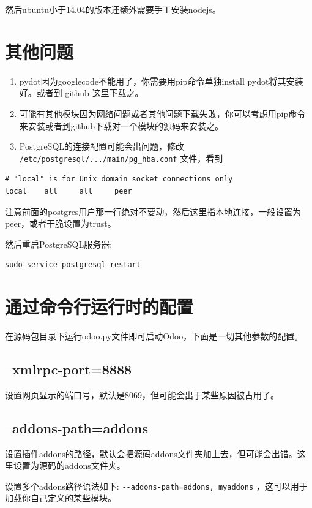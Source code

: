 \documentclass[11pt,a4paper]{sphinxmanual}
\begin{document}
然后ubuntu小于14.04的版本还额外需要手工安装nodejs。


\section{其他问题}
\label{sec-3-4}
\begin{enumerate}
\item pydot因为googlecode不能用了，你需要用pip命令单独install pydot将其安装好。或者到 \href{https://github.com/erocarrera/pydot}{github} 这里下载之。
\item 可能有其他模块因为网络问题或者其他问题下载失败，你可以考虑用pip命令来安装或者到github下载对一个模块的源码来安装之。
\item PostgreSQL的连接配置可能会出问题，修改 \verb~/etc/postgresql/.../main/pg_hba.conf~ 文件，看到
\end{enumerate}
\begin{Verbatim}
# "local" is for Unix domain socket connections only
local	 all	 all	 peer
\end{Verbatim}
注意前面的postgres用户那一行绝对不要动，然后这里指本地连接，一般设置为peer，或者干脆设置为trust。

然后重启PostgreSQL服务器:

\begin{Verbatim}
sudo service postgresql restart
\end{Verbatim}


\section{通过命令行运行时的配置}
\label{sec-3-5}
在源码包目录下运行odoo.py文件即可启动Odoo，下面是一切其他参数的配置。

\subsection{--xmlrpc-port=8888}
\label{sec-3-5-1}
设置网页显示的端口号，默认是8069，但可能会出于某些原因被占用了。

\subsection{--addons-path=addons}
\label{sec-3-5-2}
设置插件addons的路径，默认会把源码addons文件夹加上去，但可能会出错。这里设置为源码的addons文件夹。

设置多个addons路径语法如下: \verb~--addons-path=addons, myaddons~ ，这可以用于加载你自己定义的某些模块。
\end{document}

